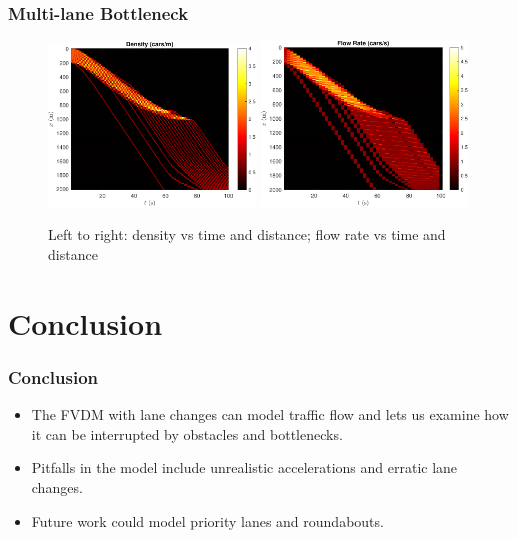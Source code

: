 \documentclass{beamer}
\begin{document}
\begin{frame}
  \frametitle{Multi-lane Bottleneck}
  \begin{figure}[H]
    \includegraphics[width=5.5cm]{mlbn_density.pdf}
    \includegraphics[width=5.5cm]{mlbn_flow.pdf}
    \caption{Left to right: density vs time and distance; flow rate vs time and distance}
\end{figure}
\end{frame}


\section{Conclusion}
\begin{frame}
  \frametitle{Conclusion}
  \begin{itemize}
    \item The FVDM with lane changes can model traffic flow and lets us examine how it can be interrupted by obstacles and bottlenecks. 

    \item Pitfalls in the model include unrealistic accelerations and erratic lane changes.
    
    \item Future work could model priority lanes and roundabouts.
  \end{itemize}
\end{frame}
\end{document}
